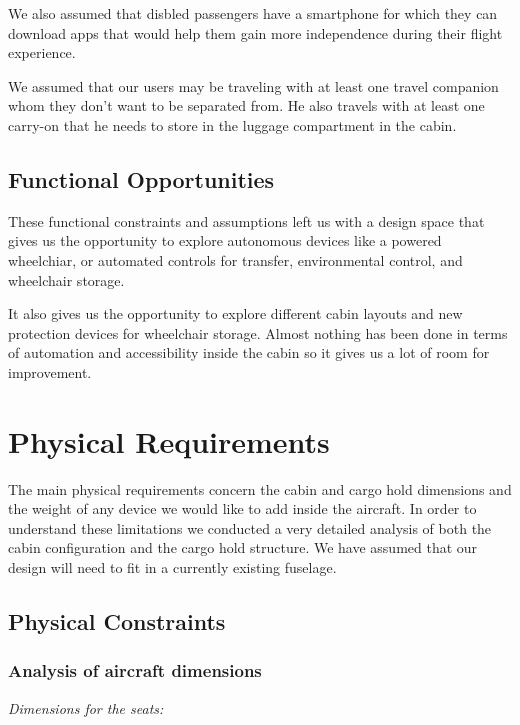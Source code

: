 We also assumed that disbled passengers have a smartphone for which they can download apps that would help them gain more independence during their flight experience.

We assumed that our users may be traveling with at least one travel companion whom they don't want to be separated from. He also travels with at least one carry-on that he needs to store in the luggage compartment in the cabin.

\subsection{Functional Opportunities}

These functional constraints and assumptions left us with a design space that gives us the opportunity to explore autonomous devices like a powered wheelchiar, or automated controls for transfer, environmental control, and wheelchair storage.

It also gives us the opportunity to explore different cabin layouts and new protection devices for wheelchair storage. Almost nothing has been done in terms of automation and accessibility inside the cabin so it gives us a lot of room for improvement.

\section{Physical Requirements}

The main physical requirements concern the cabin and cargo hold dimensions and the weight of any device we would like to add inside the aircraft. In order to understand these limitations we conducted a very detailed analysis of both the cabin configuration and the cargo hold structure. We have assumed that our design will need to fit in a currently existing fuselage.

\subsection{Physical Constraints}

\subsubsection{Analysis of aircraft dimensions}

\emph{Dimensions for the seats:}

